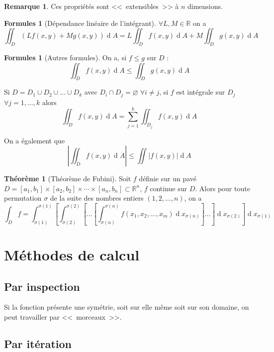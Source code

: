 \documentclass[11pt,a4paper]{article}
\theoremstyle{definition}
\newtheorem{myrem}[mydef]{Remarque}
\newtheorem{myform}[mydef]{Formules}
\newtheorem{mytheo}[mydef]{Théorème}
\DeclareMathOperator{\diff}{d}
\newcommand{\dif}{\diff\!}
\newcommand{\R}{\mathbb{R}}
\begin{document}
\begin{myrem}
	Ces propriétés sont <<~extensibles~>> à $n$ dimensions.
\end{myrem}

\begin{myform}[Dépendance linéaire de l'intégrant]
	$\forall L, M \in \R$ on a
	\[ \iint_D (L f(x,y) + M g(x,y)) \dif A = L \iint_D f(x,y) \dif A + M \iint_D g(x,y) \dif A \]
\end{myform}

\begin{myform}[Autres formules] On a, si $f \leq g$ sur $D$ :
	\[ \iint_D f(x,y) \dif A \leq \iint_D g(x,y) \dif A \]

	Si $D = D_1 \cup D_2 \cup \dots \cup D_k$ avec $D_i \cap D_j = \varnothing \; \forall i \neq j$, si $f$ est intégrale sur $D_j$ $\forall j = 1, \dots, k$ alors
	\[ \iint_D f(x,y) \dif A = \sum_{j=1}^k \iint_{D_j} f(x,y) \dif A \]

	On a également que
	\[ \left| \iint_D f(x,y) \dif A \right| \leq \iint \left| f(x,y) \right| \dif A \]
\end{myform}

\begin{mytheo}[Théorème de Fubini] Soit $f$ définie sur un pavé $D = [a_1,b_1] \times [a_2,b_2] \times \cdots \times [a_n,b_n] \subset \R^n$, $f$ continue sur $D$. Alors pour toute permutation $\sigma$ de la suite des nombres entiers $(1,2,\dots, n)$, on a
	\[ \int_D f = \int_{\sigma(1)}^{\sigma(1)} \left[ \int_{\sigma(2)}^{\sigma(2)}   \left[ \dots \left[ \int_{\sigma(n)}^{\sigma(n)} f(x_1,x_2,\dots,x_m) \dif x_{\sigma(n)} \right]   \dots \right] \dif x_{\sigma(2)} \right] \dif x_{\sigma(1)} \]
\end{mytheo}

\section{Méthodes de calcul}

\subsection{Par inspection} Si la fonction présente une symétrie, soit sur elle même soit sur son domaine, on peut travailler par <<~morceaux~>>.

\subsection{Par itération}
\end{document}
